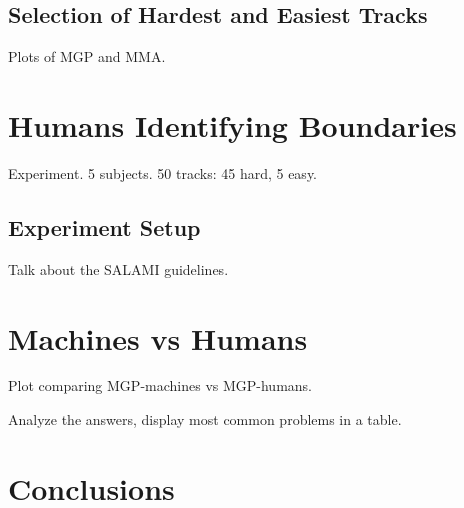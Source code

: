 \documentclass{article}
\begin{document}

\subsection{Selection of Hardest and Easiest Tracks}

Plots of MGP and MMA.

\section{Humans Identifying Boundaries}\label{sec:using_method}

Experiment. 5 subjects. 50 tracks: 45 hard, 5 easy.

\subsection{Experiment Setup}

Talk about the SALAMI guidelines.

\section{Machines vs Humans}

Plot comparing MGP-machines vs MGP-humans.

Analyze the answers, display most common problems in a table.



\section{Conclusions}
\end{document}
